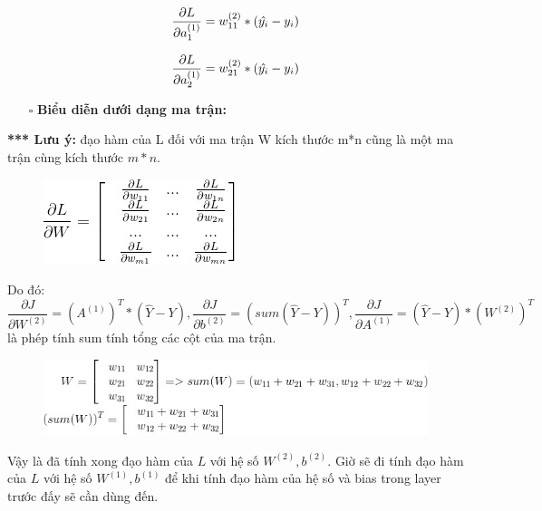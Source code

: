 $$\frac{\partial L}{\partial a_1 ^ {(1)}} =  w_{11} ^ {(2)}  *     (\hat{y_i}-y_i) \newline \newline$$

$$\frac{\partial L}{\partial a_2 ^ {(1)}} =  w_{21} ^ {(2)}  *     (\hat{y_i}-y_i) \newline \newline $$


\begin{itemize}
\item[$\square$] \textbf{Biểu diễn dưới dạng ma trận:}
\end{itemize} 
\textbf{*** Lưu ý:} đạo hàm của L đối với ma trận W kích thước m*n cũng là một ma trận cùng kích thước $m*n$.

\FloatBarrier
\begin{figure}[htp]
\begin{center}
\includegraphics[scale=1]{chap2/c2_figs/5.jpg}
\end{center}
\label{fig:feed_forward}
\end{figure}
\FloatBarrier

Do đó:
$$\frac{\partial J}{\partial W^{(2)}} = (A^{(1)})^T * (\hat{Y} - Y), \frac{\partial J}{\partial b^{(2)}} = (sum(\hat{Y} - Y))^T,  \frac{\partial J}{\partial A^{(1)}} = (\hat{Y} - Y) * (W^{(2)})^T$$ 
là phép tính sum tính tổng các cột của ma trận.

\FloatBarrier
\begin{figure}[htp]
\begin{center}
\includegraphics[scale=0.8]{chap2/c2_figs/6.jpg}
\end{center}
\label{fig:feed_forward}
\end{figure}
\FloatBarrier

Vậy là đã tính xong đạo hàm của $L$ với hệ số $W^{(2)}, b^{(2)}$. Giờ sẽ đi tính đạo hàm của $L$ với hệ số $W^{(1)}, b^{(1)}$ để khi tính đạo hàm của hệ số và bias trong layer trước đấy sẽ cần dùng đến.

